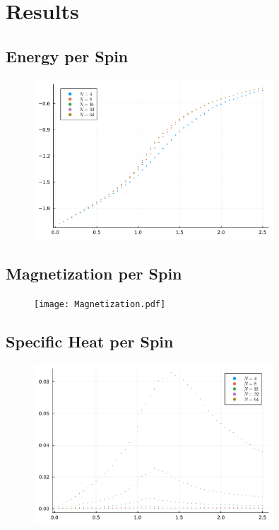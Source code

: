\section{Results}
\subsection{Energy per Spin}
\begin{figure}[H]
	\centering
	\includegraphics[width=0.8\textwidth]{Energy.pdf}
\end{figure}

\subsection{Magnetization per Spin}
\begin{figure}[H]
	\centering
	\texttt{[image: Magnetization.pdf]}
\end{figure}

\subsection{Specific Heat per Spin}
\begin{figure}[H]
	\centering
	\includegraphics[width=0.8\textwidth]{Specific_Heat.pdf}
\end{figure}

